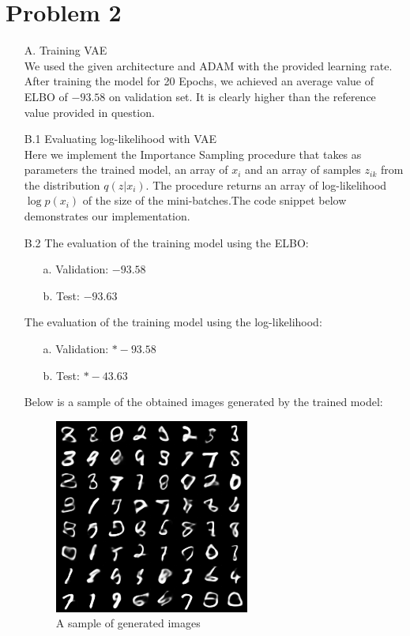 \section*{Problem 2}
\begin{itemize}
     \item[A.]{Training VAE}\\
     We used the given architecture and ADAM with the provided learning rate. After training the model for 20 Epochs, we achieved an average value of ELBO of $-93.58$ on validation set. It is clearly higher than the reference value provided in question.  
     
     \item[B.1]{Evaluating log-likelihood with VAE}\\
     Here we implement the Importance Sampling procedure that takes as parameters the trained model, an array of $x_i$ and an array of samples $z_{ik}$ from the distribution $q(z|x_i)$. The procedure returns an array of log-likelihood $\log p(x_i)$  of the size of the mini-batches.The code snippet below demonstrates our implementation. 
     
     
     
     \item[B.2]
     The evaluation of the training model using the ELBO:
     \begin{itemize}
         \item [a.] Validation: $-93.58$
         \item [b.] Test: $-93.63$
     \end{itemize}
     The evaluation of the training model using the log-likelihood:
     \begin{itemize}
         \item [a.] Validation: $*-93.58$
         \item [b.] Test: $*-43.63$
     \end{itemize}
     Below is a sample of the obtained images generated by the trained model:
\begin{figure}
  \centering
  \includegraphics[scale=1]{sample_19.png}
  \caption{A sample of generated images}
  \label{fig:gen_sample}
\end{figure}
\end{itemize}
